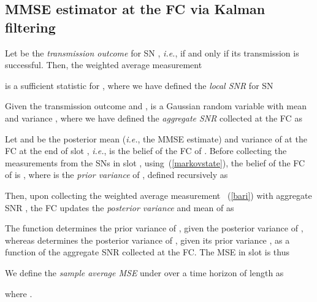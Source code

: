 \documentclass[10pt,twocolumn,twoside]{IEEEtran}
\theoremstyle{plain}
\begin{document}
\subsection{MMSE estimator at the FC via Kalman filtering}
\label{P3}
\noindent  Let  be the \emph{transmission outcome} for SN , \emph{i.e.},
    if and only if its transmission is successful. Then, the weighted average measurement
   
   is a sufficient statistic for ,
   where we have defined the \emph{local SNR} for SN 
   
    Given the transmission outcome and ,
    is a Gaussian random variable with mean  and variance
   ,
where we have defined the \emph{aggregate SNR} collected at the FC as



 Let  and  be the posterior mean (\emph{i.e.}, the MMSE estimate)
and variance of  at the FC at the end of slot ,
\emph{i.e.},  is the belief of the FC
of .
 Before collecting the measurements from the SNs in slot ,
 using~(\ref{markovstate}),
 the belief of the FC of  is ,
 where  is the \emph{prior variance} of ,
defined recursively as

Then, upon collecting the weighted average measurement ~(\ref{bari})
 with aggregate SNR ,
the FC updates the \emph{posterior variance}  and  mean  of  as

The function  determines  the prior variance of , given the posterior variance of ,
whereas  determines the posterior variance of , given its prior variance ,
as a function of the aggregate SNR  collected at the FC.
The MSE in slot  is thus

We define the \emph{sample average MSE} under  over a time horizon of length  as

where .

\vspace{-3mm}
\end{document}
